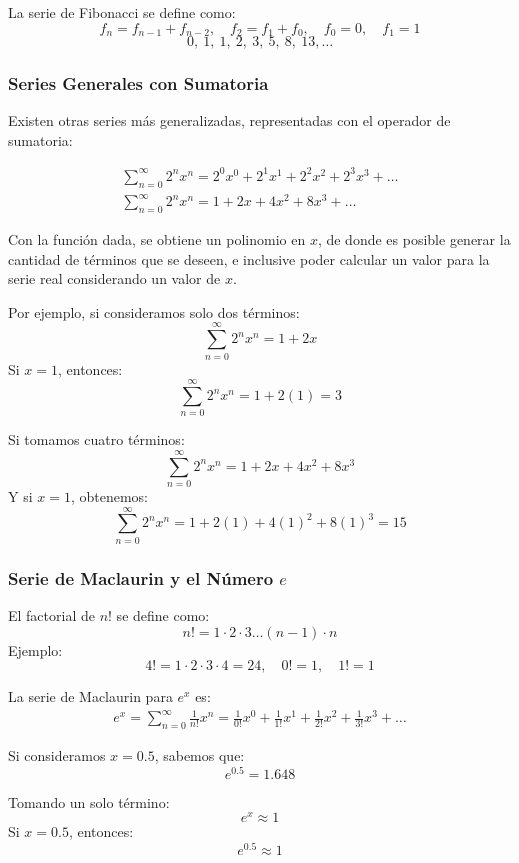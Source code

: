 La serie de Fibonacci se define como:
\[
f_n = f_{n-1} + f_{n-2}, \quad f_2 = f_1 + f_0, \quad f_0 = 0, \quad f_1 = 1
\]
\[
0, \ 1, \ 1, \ 2, \ 3, \ 5, \ 8, \ 13, \dots
\]

\subsubsection{Series Generales con Sumatoria}

Existen otras series más generalizadas, representadas con el operador de sumatoria:

\begin{gather*}
\sum _{n=0}^{\infty } 2^{n} x^{n} = 2^{0} x^{0} + 2^{1} x^{1} + 2^{2} x^{2} + 2^{3} x^{3} + \dots \\
\sum _{n=0}^{\infty } 2^{n} x^{n} = 1 + 2x + 4x^{2} + 8x^{3} + \dots
\end{gather*}

Con la función dada, se obtiene un polinomio en \(x\), de donde es posible generar la cantidad de términos que se deseen, e inclusive poder calcular un valor para la serie real considerando un valor de \(x\).

Por ejemplo, si consideramos solo dos términos:
\[
\sum _{n=0}^{\infty } 2^{n} x^{n} = 1 + 2x
\]
Si \( x = 1 \), entonces:
\[
\sum _{n=0}^{\infty } 2^{n} x^{n} = 1 + 2(1) = 3
\]

Si tomamos cuatro términos:
\[
\sum _{n=0}^{\infty } 2^{n} x^{n} = 1 + 2x + 4x^{2} + 8x^{3}
\]
Y si \( x = 1 \), obtenemos:
\[
\sum _{n=0}^{\infty } 2^{n} x^{n} = 1 + 2(1) + 4(1)^{2} + 8(1)^{3} = 15
\]

\subsubsection{Serie de Maclaurin y el Número \( e \)}

El factorial de \( n! \) se define como:
\[
n! = 1 \cdot 2 \cdot 3 \dots (n-1) \cdot n
\]
Ejemplo:
\[
4! = 1 \cdot 2 \cdot 3 \cdot 4 = 24, \quad 0! = 1, \quad 1! = 1
\]

La serie de Maclaurin para \( e^x \) es:
\begin{gather*}
e^{x} = \sum _{n=0}^{\infty } \frac{1}{n!} x^{n} = \frac{1}{0!} x^{0} + \frac{1}{1!} x^{1} + \frac{1}{2!} x^{2} + \frac{1}{3!} x^{3} + \dots
\end{gather*}

Si consideramos \( x = 0.5 \), sabemos que:
\[
e^{0.5} = 1.648
\]

Tomando un solo término:
\[
e^x \approx 1
\]
Si \( x = 0.5 \), entonces:
\[
e^{0.5} \approx 1
\]

